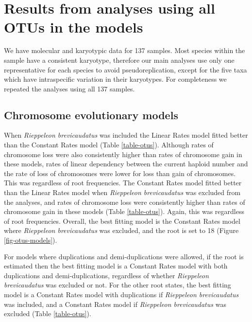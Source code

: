 \documentclass[a4paper, 12pt]{article}
\begin{document}
\newpage
\section{Results from analyses using all OTUs in the models}

We have molecular and karyotypic data for 137 samples. Most species within the sample have a consistent karyotype, therefore our main analyses use only one representative for each species to avoid pseudoreplication, except for the five taxa which have intraspecific variation in their karyotypes. For completeness we repeated the analyses using all 137 samples.

\subsection{Chromosome evolutionary models}
When \textit{Rieppeleon brevicaudatus} was included the Linear Rates model fitted better than the Constant Rates model (Table \ref{table-otus}). Although rates of chromosome loss were also consistently higher than rates of chromosome gain in these models, rates of linear dependency between the current haploid number and the rate of loss of chromosomes were lower for loss than gain of chromosomes. This was regardless of root frequencies. The Constant Rates model fitted better than the Linear Rates model when \textit{Rieppeleon brevicaudatus} was excluded from the analyses, and rates of chromosome loss were consistently higher than rates of chromosome gain in these models (Table \ref{table-otus}). Again, this was regardless of root frequencies. Overall, the best fitting model is the Constant Rates model where \textit{Rieppeleon brevicaudatus} was excluded, and the root is set to 18 (Figure \ref{fig-otus-models}). 

\noindent For models where duplications and demi-duplications were allowed, if the root is estimated then the best fitting model is a Constant Rates model with both duplications and demi-duplications, regardless of whether \textit{Rieppeleon brevicaudatus} was excluded or not. For the other root states, the best fitting model is a Constant Rates model with duplications if \textit{Rieppeleon brevicaudatus} was included, and a Constant Rates model if \textit{Rieppeleon brevicaudatus} was excluded (Table \ref{table-otus}). 

\newpage

\end{document}
